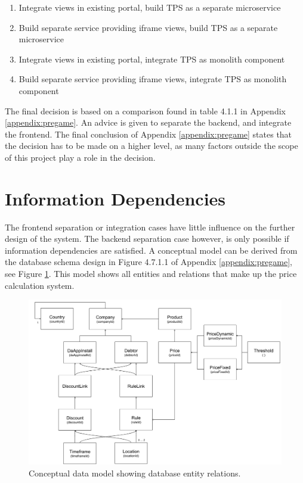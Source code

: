 \begin{enumerate}
	\item Integrate views in existing portal, build TPS as a separate microservice
	\item Build separate service providing iframe views, build TPS as a separate microservice
	\item Integrate views in existing portal, integrate TPS as monolith component
	\item Build separate service providing iframe views, integrate TPS as monolith component
\end{enumerate}

The final decision is based on a comparison found in table 4.1.1 in Appendix \ref{appendix:pregame}. An advice is given to separate the backend, and integrate the frontend. The final conclusion of Appendix \ref{appendix:pregame} states that the decision has to be made on a higher level, as many factors outside the scope of this project play a role in the decision.

%
\section{Information Dependencies}
The frontend separation or integration cases have little influence on the further design of the system. The backend separation case however, is only possible if information dependencies are satisfied. A conceptual model can be derived from the database schema design in Figure 4.7.1.1 of Appendix \ref{appendix:pregame}, see Figure \ref{fig:DataModel}. This model shows all entities and relations that make up the price calculation system.

\begin{figure}[H]
	\centering
	\includegraphics[width=1\textwidth]{DataModel}
	\caption[DataModel]{Conceptual data model showing database entity relations.}
	\label{fig:DataModel}
\end{figure}

